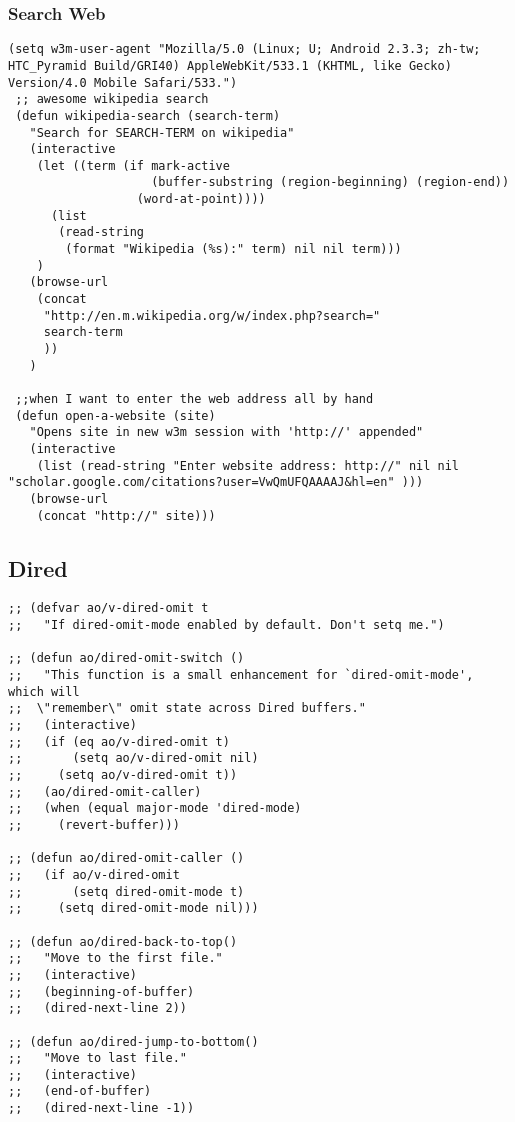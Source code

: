 \documentclass[11pt]{article}
\begin{document}
\subsubsection{Search Web}
\label{sec:orgheadline27}
\begin{verbatim}
(setq w3m-user-agent "Mozilla/5.0 (Linux; U; Android 2.3.3; zh-tw; HTC_Pyramid Build/GRI40) AppleWebKit/533.1 (KHTML, like Gecko) Version/4.0 Mobile Safari/533.")
 ;; awesome wikipedia search
 (defun wikipedia-search (search-term)
   "Search for SEARCH-TERM on wikipedia"
   (interactive
    (let ((term (if mark-active
                    (buffer-substring (region-beginning) (region-end))
                  (word-at-point))))
      (list
       (read-string
        (format "Wikipedia (%s):" term) nil nil term)))
    )
   (browse-url
    (concat
     "http://en.m.wikipedia.org/w/index.php?search="
     search-term
     ))
   )

 ;;when I want to enter the web address all by hand
 (defun open-a-website (site)
   "Opens site in new w3m session with 'http://' appended"
   (interactive
    (list (read-string "Enter website address: http://" nil nil "scholar.google.com/citations?user=VwQmUFQAAAAJ&hl=en" )))
   (browse-url
    (concat "http://" site)))
\end{verbatim}
\subsection{Dired}
\label{sec:orgheadline29}
\begin{verbatim}
;; (defvar ao/v-dired-omit t
;;   "If dired-omit-mode enabled by default. Don't setq me.")

;; (defun ao/dired-omit-switch ()
;;   "This function is a small enhancement for `dired-omit-mode', which will
;;  \"remember\" omit state across Dired buffers."
;;   (interactive)
;;   (if (eq ao/v-dired-omit t)
;;       (setq ao/v-dired-omit nil)
;;     (setq ao/v-dired-omit t))
;;   (ao/dired-omit-caller)
;;   (when (equal major-mode 'dired-mode)
;;     (revert-buffer)))

;; (defun ao/dired-omit-caller ()
;;   (if ao/v-dired-omit
;;       (setq dired-omit-mode t)
;;     (setq dired-omit-mode nil)))

;; (defun ao/dired-back-to-top()
;;   "Move to the first file."
;;   (interactive)
;;   (beginning-of-buffer)
;;   (dired-next-line 2))

;; (defun ao/dired-jump-to-bottom()
;;   "Move to last file."
;;   (interactive)
;;   (end-of-buffer)
;;   (dired-next-line -1))
\end{verbatim}
\end{document}
